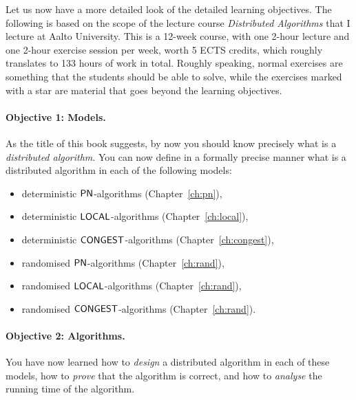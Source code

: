 Let us now have a more detailed look of the detailed learning objectives. The following is based on the scope of the lecture course \emph{Distributed Algorithms} that I lecture at Aalto University. This is a 12-week course, with one 2-hour lecture and one 2-hour exercise session per week, worth 5 ECTS credits, which roughly translates to 133 hours of work in total. Roughly speaking, normal exercises are something that the students should be able to solve, while the exercises marked with a star are material that goes beyond the learning objectives.


\paragraph{Objective 1: Models.}

As the title of this book suggests, by now you should know precisely what is a \emph{distributed algorithm}. You can now define in a formally precise manner what is a distributed algorithm in each of the following models:
\begin{itemize}[noitemsep]
    \item deterministic $\textup{\sffamily PN}$-algorithms (Chapter~\ref{ch:pn}),
    \item deterministic $\textup{\sffamily LOCAL}$-algorithms (Chapter~\ref{ch:local}),
    \item deterministic $\textup{\sffamily CONGEST}$-algorithms (Chapter~\ref{ch:congest}),
    \item randomised $\textup{\sffamily PN}$-algorithms (Chapter~\ref{ch:rand}),
    \item randomised $\textup{\sffamily LOCAL}$-algorithms (Chapter~\ref{ch:rand}),
    \item randomised $\textup{\sffamily CONGEST}$-algorithms (Chapter~\ref{ch:rand}).
\end{itemize}


\paragraph{Objective 2: Algorithms.}

You have now learned how to \emph{design} a distributed algorithm in each of these models, how to \emph{prove} that the algorithm is correct, and how to \emph{analyse} the running time of the algorithm.

